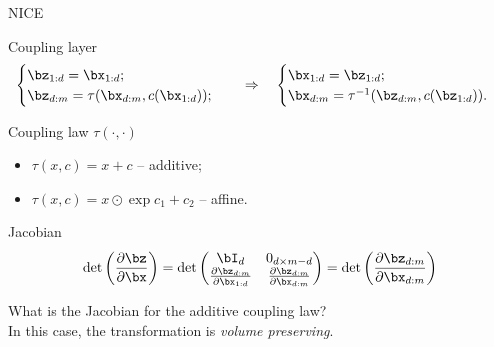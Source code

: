 \begin{frame}{NICE}
	\begin{block}{Coupling layer}
		\vspace{-0.8cm}
		\begin{equation*}
			\begin{cases} \bz_{1:d} = \bx_{1:d}; \\ \bz_{d:m} = \tau (\bx_{d:m}, c(\bx_{1:d}));\end{cases} 
			\quad \Rightarrow \quad 
			\begin{cases} \bx_{1:d} = \bz_{1:d}; \\ \bx_{d:m} = \tau^{-1} (\bz_{d:m}, c(\bz_{1:d})).\end{cases}
		\end{equation*}
		\vspace{-0.5cm}
	\end{block}
	\begin{block}{Coupling law $\tau(\cdot, \cdot)$}
		\begin{itemize}
			\item $\tau(x, c) = x + c$ -- additive;
			\item $\tau(x, c) = x \odot \exp{c_1} + c_2$ -- affine.
		\end{itemize}
	\end{block}
	
	\begin{block}{Jacobian}
			\vspace{-0.3cm}
		\[
		\det \left( \frac{\partial \bz}{\partial \bx} \right) = \det 
		\begin{pmatrix}
			\bI_d & 0_{d \times m - d} \\
			\frac{\partial \bz_{d:m}}{\partial \bx_{1:d}} & \frac{\partial \bz_{d:m}}{\partial \bx_{d:m}}
		\end{pmatrix} = 
		\det \left( \frac{\partial \bz_{d:m}}{\partial \bx_{d:m}} \right)
		\]
	\end{block}
	What is the Jacobian for the additive coupling law? \\
	In this case, the transformation is \textit{volume preserving}.
	
\end{frame}
